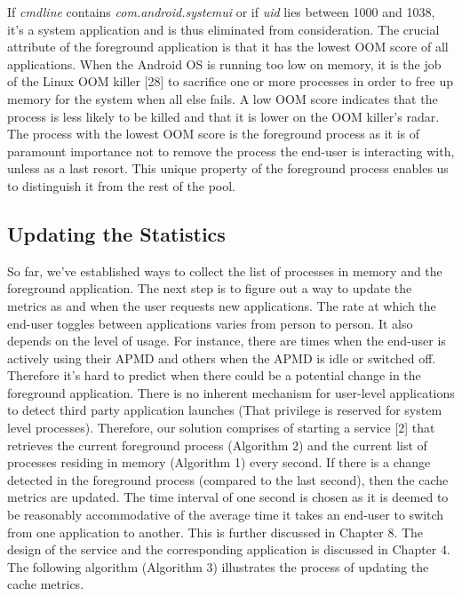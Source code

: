 \documentclass[12pt]{uthesis-v12}  %
\begin{document}
			If {\em cmdline} contains {\em com.android.systemui} or if {\em uid} lies between 1000 and 1038, it's a system application and is thus eliminated from consideration. The crucial attribute of the foreground application is that it has the lowest OOM score of all applications. When the Android OS is running too low on memory, it is the job of the Linux OOM killer [28] to sacrifice one or more processes in order to free up memory for the system when all else fails. A low OOM score indicates that the process is less likely to be killed and that it is lower on the OOM killer's radar. The process with the lowest OOM score is the foreground process as it is of paramount importance not to remove the process the end-user is interacting with, unless as a last resort. This unique property of the foreground process enables us to distinguish it from the rest of the pool. 
			
		\subsection{Updating the Statistics}
			 So far, we've established ways to collect the list of processes in memory and the foreground application. The next step is to figure out a way to update the metrics as and when the user requests new applications. The rate at which the end-user toggles between applications varies from person to person. It also depends on the level of usage. For instance, there are times when the end-user is actively using their APMD and others when the APMD is idle or switched off. Therefore it's hard to predict when there could be a potential change in the foreground application. There is no inherent mechanism for user-level applications to detect third party application launches (That privilege is reserved for system level processes). Therefore, our solution comprises of starting a service [2] that retrieves the current foreground process (Algorithm 2) and the current list of processes residing in memory (Algorithm 1) every second. If there is a change detected in the foreground process (compared to the last second), then the cache metrics are updated. The time interval of one second is chosen as it is deemed to be reasonably accommodative of the average time it takes an end-user to switch from one application to another. This is further discussed in Chapter 8. The design of the service and the corresponding application is discussed in Chapter 4. The following algorithm (Algorithm 3) illustrates the process of updating the cache metrics.\\     
			 
\end{document}

